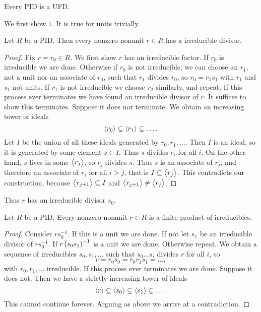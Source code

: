 \begin{theorem}
\label{thm:3.3.2}
Every PID is a UFD.
\end{theorem}

We first show $ 1 $. It is true for units trivially.

\begin{lemma}
Let $ R $ be a PID. Then every nonzero nonunit $ r \in R $ has a irreducible divisor.
\end{lemma}

\begin{proof}
Fix $ r = r_0 \in R $. We first show $ r $ has an irreducible factor. If $ r_0 $ is irreducible we are done. Otherwise if $ r_0 $ is not irreducible, we can choose an $ r_1 $, not a unit nor an associate of $ r_0 $, such that $ r_1 $ divides $ r_0 $, so $ r_0 = r_1s_1 $ with $ r_1 $ and $ s_1 $ not units. If $ r_1 $ is not irreducible we choose $ r_2 $ similarly, and repeat. If this process ever terminates we have found an irreducible divisor of $ r $. It suffices to show this terminates. Suppose it does not terminate. We obtain an increasing tower of ideals
$$ \left\langle r_0 \right\rangle \subsetneq \left\langle r_1 \right\rangle \subsetneq \dots. $$
Let $ I $ be the union of all these ideals generated by $ r_0, r_1, \dots $. Then $ I $ is an ideal, so it is generated by some element $ s \in I $. Thus $ s $ divides $ r_i $ for all $ i $. On the other hand, $ s $ lives in some $ \left\langle r_j \right\rangle $, so $ r_j $ divides $ s $. Thus $ s $ is an associate of $ r_j $, and therefore an associate of $ r_i $ for all $ i > j $, that is $ I \subseteq \left\langle r_j \right\rangle $. This contradicts our construction, because $ \left\langle r_{j + 1} \right\rangle \subseteq I $ and $ \left\langle r_{j + 1} \right\rangle \ne \left\langle r_j \right\rangle $.
\end{proof}

Thus $ r $ has an irreducible divisor $ s_0 $.

\begin{lemma}
Let $ R $ be a PID. Every nonzero nonunit $ r \in R $ is a finite product of irreducibles.
\end{lemma}

\begin{proof}
Consider $ rs_0^{-1} $. If this is a unit we are done. If not let $ s_1 $ be an irreducible divisor of $ rs_0^{-1} $. If $ r\br{s_0s_1}^{-1} $ is a unit we are done. Otherwise repeat. We obtain a sequence of irreducibles $ s_0, s_1, \dots $ such that $ s_0 \dots s_i $ divides $ r $ for all $ i $, so
$$ r = r_0s_0 = r_0r_1s_1 = \dots, $$
with $ r_0, r_1, \dots $ irreducible. If this process ever terminates we are done. Suppose it does not. Then we have a strictly increasing tower of ideals
$$ \left\langle r \right\rangle \subsetneq \left\langle s_0 \right\rangle \subsetneq \left\langle s_1 \right\rangle \subsetneq \dots. $$
This cannot continue forever. Arguing as above we arrive at a contradiction.
\end{proof}

